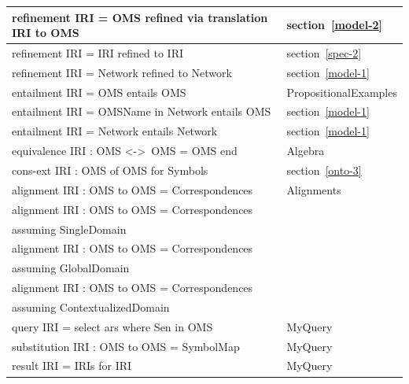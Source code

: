 \documentclass[10pt,fleqn,final]{scrreprt}
\newcommand*{\lessthan}{<}
\newcommand*{\greaterthan}{>}
\begin{document}
\begin{tabular}{|l|l|}
refinement IRI = OMS refined via translation IRI to OMS & section~\ref{model-2} \\\hline
refinement IRI = IRI refined to IRI & section~\ref{spec-2} \\\hline
refinement IRI = Network refined to Network & section~\ref{model-1} \\\hline
entailment IRI = OMS entails OMS & PropositionalExamples \\\hline
entailment IRI = OMSName in Network entails OMS & section~\ref{model-1}\\\hline
entailment IRI = Network entails Network & section~\ref{model-1}\\\hline
equivalence IRI : OMS \lessthan-\greaterthan\ OMS = OMS end  &  Algebra \\\hline
cons-ext IRI : OMS of OMS for Symbols  & section~\ref{onto-3} \\\hline
alignment IRI : OMS to OMS = Correspondences  & Alignments \\\hline
alignment IRI : OMS to OMS = Correspondences & \\
\qquad assuming SingleDomain & \cite{OM2014} \\\hline
alignment IRI : OMS to OMS = Correspondences & \\
\qquad assuming GlobalDomain & \cite{OM2014} \\\hline
alignment IRI : OMS to OMS = Correspondences & \\
\qquad assuming ContextualizedDomain & \cite{OM2014} \\\hline
query IRI = select ars where Sen in OMS & MyQuery\\\hline
substitution IRI : OMS to OMS = SymbolMap & MyQuery\\\hline
result IRI = IRIs for IRI & MyQuery\\\hline
\end{tabular}
\end{document}
